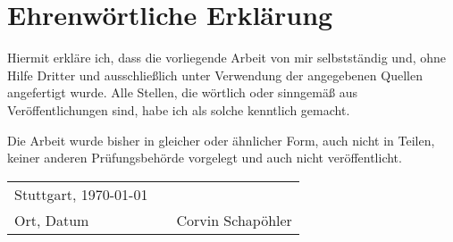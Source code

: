 \chapter*{Ehrenwörtliche Erklärung}
\thispagestyle{front}
Hiermit erkläre ich, dass die vorliegende Arbeit von mir selbstständig und, ohne Hilfe Dritter und ausschließlich unter Verwendung der angegebenen Quellen angefertigt wurde. Alle Stellen, die wörtlich oder sinngemäß aus Veröffentlichungen sind, habe ich als solche kenntlich gemacht.

Die Arbeit wurde bisher in gleicher oder ähnlicher Form, auch nicht in Teilen, keiner anderen Prüfungsbehörde vorgelegt und auch nicht veröffentlicht.
\vspace{2cm}

\begin{center}
	\begin{tabular}[h]{lp{2cm}p{5.5cm}}
		Stuttgart, \today & & \\
		\cline{1-1}\cline{3-3}
		Ort, Datum& & Corvin Schapöhler\\
	\end{tabular}
\end{center}

